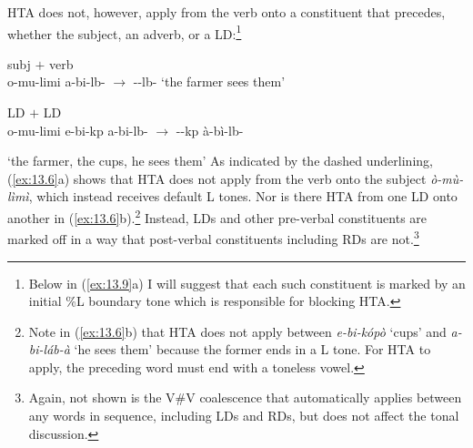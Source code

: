 \documentclass[output=paper]{langsci/langscibook}
\begin{document}
\gls{HTA} does not, however, apply from the verb onto a constituent that
precedes, whether the subject, an adverb, or a \gls{LD}:\footnote{Below in
    (\ref{ex:13.9}a) I will suggest that each such constituent is marked by an
    initial \%L boundary tone which is responsible for blocking \gls{HTA}.}

\ea\label{ex:13.6}
    \ea subj $+$ verb\\
    o-mu-limi  a-bi-lb- ${\rightarrow}$
    --lb-  ‘the farmer sees them’
        \vspace{.75\baselineskip}
    \ex \gls{LD} $+$ {LD}\\
        o-mu-limi e-bi-kp a-bi-lb-
            ${\rightarrow}$ --kp
                à-bì-lb-\\\vspace{1\baselineskip}
        ‘the farmer, the cups, he sees them’
    \z
\z
As indicated by the dashed underlining, (\ref{ex:13.6}a) shows that \gls{HTA}
does not apply from the verb onto the subject \emph{ò-mù-lìmì}, which instead
receives default L tones. Nor is there \gls{HTA} from one \gls{LD} onto another in
(\ref{ex:13.6}b).\footnote{Note in (\ref{ex:13.6}b) that \gls{HTA} does not
    apply between \emph{e-bi-kópò} ‘cups’ and \emph{a-bi-láb-à} ‘he sees them’
because the former ends in a L tone. For \gls{HTA} to apply, the preceding word
must end with a toneless vowel.}  Instead, \glspl{LD} and other pre-verbal
constituents are marked off in a way that post-verbal constituents including
RDs are not.\footnote{Again, not shown is the V\#V coalescence that
automatically applies between any words in sequence, including \glspl{LD} and RDs, but
does not affect the tonal discussion.}
\end{document}
